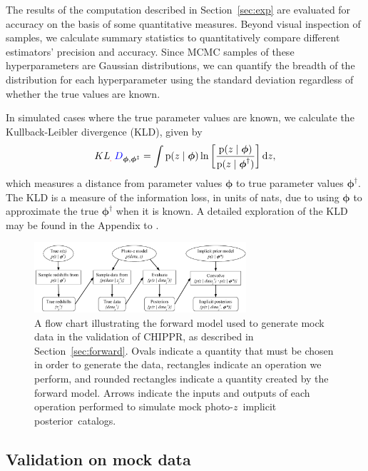\documentclass[iop]{emulateapj}
\newcommand{\new}[2]{{\color{red}\sout{#1}}\ {\color{blue}{#2}}}%
\newcommand{\Sect}[1]{Section~\ref{#1}}
\newcommand{\project}[1]{\textsc{#1}}
\newcommand{\Chippr}{\project{CHIPPR}}
\newcommand{\pr}[1]{\ensuremath{\mathrm{p}(#1)}}
\newcommand{\gvn}{\mid}
\newcommand{\integral}[2]{\ensuremath{\int #1 \mathrm{d} #2}}
\newcommand{\pz}{photo-$z$}
\newcommand{\pzip}{\pz\ implicit posterior}
\newcommand{\bvec}[1]{\ensuremath{\boldsymbol{#1}}}
\newcommand{\ndphi}{\bvec{\phi}}
\begin{document}
The results of the computation described in \Sect{sec:exp} are evaluated for accuracy on the basis of some quantitative measures.  
Beyond visual inspection of samples, we calculate summary statistics to quantitatively compare different estimators' precision and accuracy.  
Since MCMC samples of these hyperparameters are Gaussian distributions, we can quantify the breadth of the distribution for each hyperparameter using the standard deviation regardless of whether the true values are known.  

In simulated cases where the true parameter values are known, we calculate the Kullback-Leibler divergence (KLD), given by 
\begin{equation}
\label{eqn:kl}
KL\new{}{D}_{\ndphi,\ndphi^{\ddagger}} = \integral{\pr{z \gvn \ndphi} \ln \left[ \frac{\pr{z \gvn \ndphi}}{\pr{z \gvn \ndphi^{\dagger}}} \right]}{z} ,
\end{equation}
which measures a distance from parameter values $\ndphi$ to true parameter values $\ndphi^{\dagger}$.  
The KLD is a measure of the information loss, in units of nats, due to using $\ndphi$ to approximate the true $\ndphi^{\dagger}$ when it is known.
A detailed exploration of the KLD may be found in the Appendix to \citet{malz_approximating_2018}.

\begin{figure}
	\begin{center}
		\includegraphics[width=0.7\textwidth]{flowchart.pdf}
		\caption{
			A flow chart illustrating the forward model used to generate mock data in the validation of \Chippr, as described in \Sect{sec:forward}.
			Ovals indicate a quantity that must be chosen in order to generate the data, rectangles indicate an operation we perform, and rounded rectangles indicate a quantity created by the forward model.
			Arrows indicate the inputs and outputs of each operation performed to simulate mock \pzip\ catalogs.
		}
		\label{fig:flowchart}
	\end{center}
\end{figure}

\subsection{Validation on mock data}
\label{sec:mock}
\end{document}
